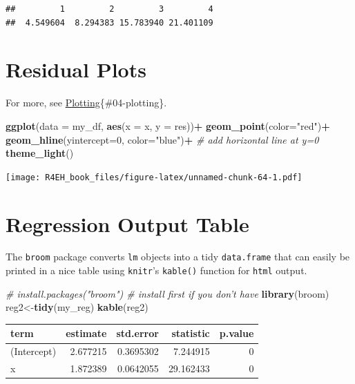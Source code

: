 \documentclass[]{book}
\newenvironment{Shaded}{\begin{snugshade}}{\end{snugshade}}
\newcommand{\KeywordTok}[1]{\textcolor[rgb]{0.13,0.29,0.53}{\textbf{#1}}}
\newcommand{\DataTypeTok}[1]{\textcolor[rgb]{0.13,0.29,0.53}{#1}}
\newcommand{\DecValTok}[1]{\textcolor[rgb]{0.00,0.00,0.81}{#1}}
\newcommand{\StringTok}[1]{\textcolor[rgb]{0.31,0.60,0.02}{#1}}
\newcommand{\CommentTok}[1]{\textcolor[rgb]{0.56,0.35,0.01}{\textit{#1}}}
\newcommand{\OperatorTok}[1]{\textcolor[rgb]{0.81,0.36,0.00}{\textbf{#1}}}
\newcommand{\NormalTok}[1]{#1}
\theoremstyle{definition}
\theoremstyle{definition}
\theoremstyle{definition}
\theoremstyle{remark}
\begin{document}
\begin{verbatim}
##         1         2         3         4 
##  4.549604  8.294383 15.783940 21.401109
\end{verbatim}

\section{Residual Plots}\label{residual-plots}

For more, see \protect\hyperlink{plotting}{Plotting}\{\#04-plotting\}.

\begin{Shaded}
\begin{Highlighting}[]
\KeywordTok{ggplot}\NormalTok{(}\DataTypeTok{data =}\NormalTok{ my_df, }\KeywordTok{aes}\NormalTok{(}\DataTypeTok{x =}\NormalTok{ x, }\DataTypeTok{y =}\NormalTok{ res))}\OperatorTok{+}
\StringTok{  }\KeywordTok{geom_point}\NormalTok{(}\DataTypeTok{color=}\StringTok{"red"}\NormalTok{)}\OperatorTok{+}
\StringTok{  }\KeywordTok{geom_hline}\NormalTok{(}\DataTypeTok{yintercept=}\DecValTok{0}\NormalTok{, }\DataTypeTok{color=}\StringTok{"blue"}\NormalTok{)}\OperatorTok{+}\StringTok{ }\CommentTok{# add horizontal line at y=0}
\StringTok{  }\KeywordTok{theme_light}\NormalTok{()}
\end{Highlighting}
\end{Shaded}

\texttt{[image: R4EH\_book\_files/figure-latex/unnamed-chunk-64-1.pdf]}

\section{Regression Output Table}\label{regression-output-table}

The \texttt{broom} package converts \texttt{lm} objects into a tidy
\texttt{data.frame} that can easily be printed in a nice table using
\texttt{knitr}'s \texttt{kable()} function for \texttt{html} output.

\begin{Shaded}
\begin{Highlighting}[]
\CommentTok{# install.packages("broom") # install first if you don't have }
\KeywordTok{library}\NormalTok{(broom)}
\NormalTok{reg2<-}\KeywordTok{tidy}\NormalTok{(my_reg)}
\KeywordTok{kable}\NormalTok{(reg2)}
\end{Highlighting}
\end{Shaded}

\begin{tabular}{l|r|r|r|r}
\hline
term & estimate & std.error & statistic & p.value\\
\hline
(Intercept) & 2.677215 & 0.3695302 & 7.244915 & 0\\
\hline
x & 1.872389 & 0.0642055 & 29.162433 & 0\\
\hline
\end{tabular}
\end{document}
